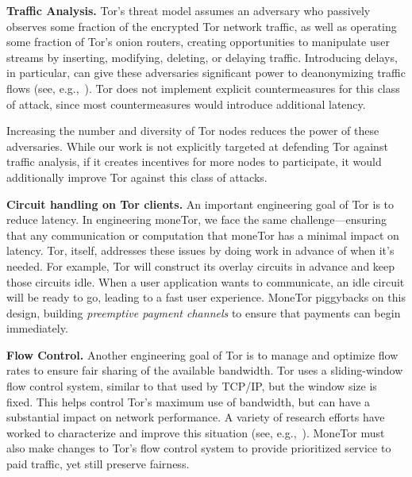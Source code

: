 \textbf{Traffic Analysis.}  
Tor's threat model assumes an adversary who passively observes some fraction of the encrypted Tor network traffic, as well as operating some fraction of Tor's onion routers, creating opportunities to manipulate user streams by inserting, modifying, deleting, or delaying traffic. Introducing delays, in particular, can give these adversaries significant power to deanonymizing traffic flows (see, e.g.,~\cite{fu2009one,rochet2018dropping}). Tor does not implement explicit countermeasures for this class of attack, since most countermeasures would introduce additional latency.

Increasing the number and diversity of Tor nodes reduces the power of these adversaries. While our work is not explicitly targeted at defending Tor against traffic analysis, if it creates incentives for more nodes to participate, it would additionally improve Tor against this class of attacks.

\medskip \noindent \textbf{Circuit handling on Tor clients.}
An important engineering goal of Tor is to reduce latency. In engineering moneTor, we face the same challenge---ensuring that any communication or computation that moneTor has a minimal impact on latency.  Tor, itself, addresses these issues by doing work in advance of when it's needed. For example, Tor will construct its overlay circuits in advance and keep those circuits idle. When a user application wants to communicate, an idle circuit will be ready to go, leading to a fast user experience. MoneTor piggybacks on this design, building {\em preemptive payment channels} to ensure that payments can begin immediately.

\medskip \noindent\textbf{Flow Control.}
Another engineering goal of Tor is to manage and optimize flow rates to ensure fair sharing of the available bandwidth. Tor uses a sliding-window flow control system, similar to that used by TCP/IP, but the window size is fixed. This helps control Tor's maximum use of bandwidth, but can have a substantial impact on network performance. A variety of research efforts have worked to characterize and improve this situation (see, e.g.,~\cite{pets2011-defenestrator,mind-the-gap-2016}). MoneTor must also make changes to Tor's flow control system to provide prioritized service to paid traffic, yet still preserve fairness.

